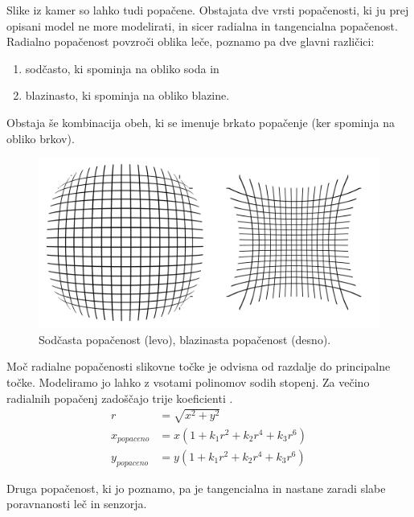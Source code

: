 \documentclass[a4paper, 12pt]{book}
\begin{document}
Slike iz kamer so lahko tudi popačene. Obstajata dve vrsti popačenosti, ki ju prej opisani model ne more modelirati, in sicer radialna in tangencialna popačenost. Radialno popačenost povzroči oblika leče, poznamo pa dve glavni različici:
\begin{enumerate}
\itemsep0em
\item sodčasto, ki spominja na obliko soda in
\item blazinasto, ki spominja na obliko blazine.
\end{enumerate}
Obstaja še kombinacija obeh, ki se imenuje brkato popačenje (ker spominja na obliko brkov).

\begin{figure}[H]
\centering
\includegraphics[width=\textwidth,height=\textheight,keepaspectratio]{distorsion.png}
\caption{Sodčasta popačenost (levo), blazinasta popačenost (desno).}
\end{figure}

Moč radialne popačenosti slikovne točke je odvisna od razdalje do principalne točke. Modeliramo jo lahko z vsotami polinomov sodih stopenj. Za večino radialnih popačenj zadoščajo trije koeficienti \cite{ Hartley2004, zhang2000flexible, brown1966decentering}. 
\begin{align}
r &= \sqrt{x^2 + y^2} \\ 
x_{popaceno} &= x(1 + k_1r^2 + k_2r^4 + k_3r^6) \\
y_{popaceno} &= y(1 + k_1r^2 + k_2r^4 + k_3r^6) \label{radialdisteq}
\end{align}

Druga popačenost, ki jo poznamo, pa je tangencialna in nastane zaradi slabe poravnanosti leč in senzorja.
\end{document}
